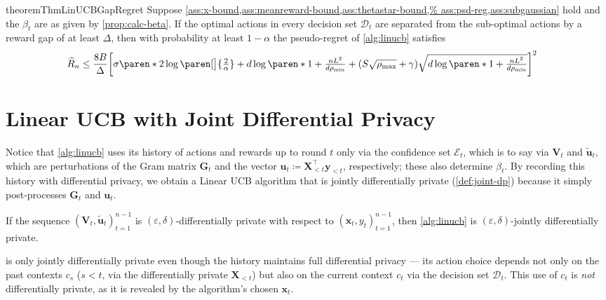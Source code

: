 \documentclass{article}
\renewcommand{\vec}[1]{\bm{#1}}
\newcommand{\defeq}{\coloneq}
\DeclarePairedDelimiter{\paren}()
\DeclarePairedDelimiter{\brck}{[}{]}
\newcommand{\D}{\mathcal{D}}
\newcommand{\E}{\mathcal{E}}
\providecommand\transp{\top}
\let\transpsymbol\transp
\renewcommand{\transp}[1]{#1^\transpsymbol}
\begin{document}
\begin{restatable}{theorem}{ThmLinUCBGapRegret}%
  \label{thm:linucb-gap-regret}
  Suppose \cref{ass:x-bound,ass:meanreward-bound,ass:thetastar-bound,%
    ass:psd-reg,ass:subgaussian} hold and the
  $\beta_t$ are as given by \cref{prop:calc-beta}.  If the optimal
  actions in every decision set $\D_t$ are separated from the
  sub-optimal actions by a reward gap of at least $\Delta$, then with
  probability at least $1-\alpha$ the pseudo-regret of
  \cref{alg:linucb} satisfies
  \begin{align}
  \label{eq:regret_gap_general_formula}
    \widehat R_n
    &\le \frac{8B}{\Delta} \brck[\bigg]{\sigma\paren*{2\log\paren[\big]{\tfrac{2}{\alpha}}
      + d\log\paren*{1 + \tfrac{nL^2}{d\rho_{\min}}}}
      + (S\sqrt{\rho_{\max}}+\gamma)\sqrt{d\log\paren*{1+\tfrac{nL^2}{d\rho_{\min}}}}}^2
  \end{align}
\end{restatable}

\section{Linear UCB with Joint Differential Privacy}
\label{sec:alg-dp}

Notice that \cref{alg:linucb} uses its history of actions and rewards
up to round $t$ only via the confidence set $\E_t$, which is to say
via $\vec V_t$ and $\tilde{\vec u}_t$, which are perturbations of the Gram
matrix $\vec G_t$ and the vector
$\vec u_t \defeq \transp{\vec X_{<t}} \vec y_{<t}$, respectively;
these also determine $\beta_t$.  By recording this history with
differential privacy, we obtain a Linear UCB algorithm that is jointly
differentially private (\cref{def:joint-dp}) because it simply
post-processes $\vec G_t$ and $\vec u_t$.

\begin{claim}
  If the sequence $(\vec V_t,\tilde{\vec u}_t)_{t=1}^{n-1}$ is
  $(\varepsilon,\delta)$-differentially private with respect to
  $(\vec x_t, y_t)_{t=1}^{n-1}$, then \cref{alg:linucb} is
  $(\varepsilon,\delta)$-jointly differentially private.
\end{claim}

\begin{remark}
   is only jointly differentially private even though
  the history maintains full differential privacy --- its action
  choice depends not only on the past contexts $c_s$ ($s < t$, via the
  differentially private $\vec X_{<t}$) but also on the current
  context $c_t$ via the decision set $\D_t$.  This use of $c_t$
  is \emph{not} differentially private, as it is revealed by the algorithm's
  chosen $\vec x_t$.
\end{remark}
\end{document}
